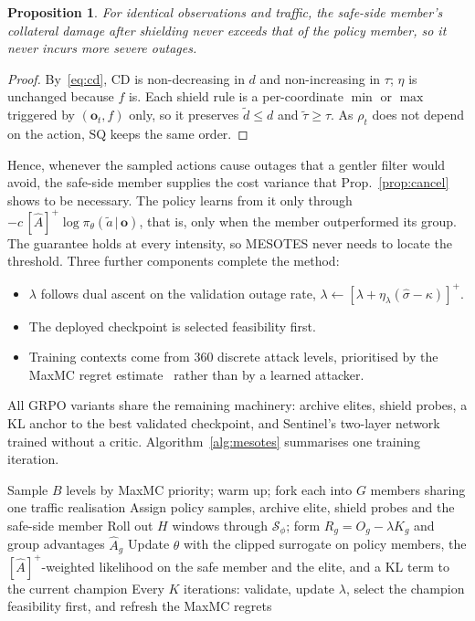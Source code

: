 \documentclass[journal]{IEEEtran}
\newtheorem{proposition}{Proposition}
\begin{document}
\begin{proposition}\label{prop:safe}
For identical observations and traffic, the safe-side member's collateral damage after shielding never exceeds that of the policy member, so it never incurs more severe outages.
\end{proposition}
\begin{proof}
By~\eqref{eq:cd}, $\mathrm{CD}$ is non-decreasing in $d$ and non-increasing in $\tau$; $\eta$ is unchanged because $f$ is. Each shield rule is a per-coordinate $\min$ or $\max$ triggered by $(\mathbf{o}_t,f)$ only, so it preserves $\tilde d\le d$ and $\tilde\tau\ge\tau$. As $\rho_t$ does not depend on the action, $\mathrm{SQ}$ keeps the same order.
\end{proof}

Hence, whenever the sampled actions cause outages that a gentler filter would avoid, the safe-side member supplies the cost variance that Prop.~\ref{prop:cancel} shows to be necessary. The policy learns from it only through $-c\,[\hat A]^+\log\pi_\theta(\tilde a\,|\,\mathbf{o})$, that is, only when the member outperformed its group. The guarantee holds at every intensity, so MESOTES never needs to locate the threshold. Three further components complete the method:
\begin{itemize}
\item $\lambda$ follows dual ascent on the validation outage rate, $\lambda\leftarrow[\lambda+\eta_\lambda(\hat\sigma-\kappa)]^+$.
\item The deployed checkpoint is selected feasibility first.
\item Training contexts come from 360 discrete attack levels, prioritised by the MaxMC regret estimate~\cite{jiang2021robustplr,jiang2021plr} rather than by a learned attacker.
\end{itemize}
All GRPO variants share the remaining machinery: archive elites, shield probes, a KL anchor to the best validated checkpoint, and Sentinel's two-layer network trained without a critic. Algorithm~\ref{alg:mesotes} summarises one training iteration.

\begin{algorithm}[t]
\caption{One MESOTES training iteration}
\label{alg:mesotes}
\small
\begin{algorithmic}[1]
\STATE Sample $B$ levels by MaxMC priority; warm up; fork each into $G$ members sharing one traffic realisation
\STATE Assign policy samples, archive elite, shield probes and the safe-side member
\STATE Roll out $H$ windows through $\mathcal{S}_\phi$; form $R_g=O_g-\lambda K_g$ and group advantages $\hat A_g$
\STATE Update $\theta$ with the clipped surrogate on policy members, the $[\hat A]^+$-weighted likelihood on the safe member and the elite, and a KL term to the current champion
\STATE Every $K$ iterations: validate, update $\lambda$, select the champion feasibility first, and refresh the MaxMC regrets
\end{algorithmic}
\end{algorithm}
\end{document}
